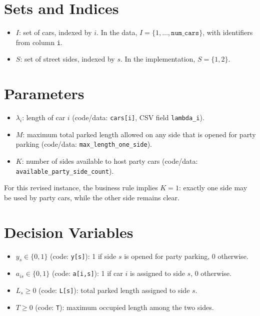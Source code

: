 \section*{Sets and Indices}

\begin{itemize}
    \item \(I\): set of cars, indexed by \(i\). In the data, \(I=\{1,\dots,\texttt{num\_cars}\}\), with identifiers from column \texttt{i}.
    \item \(S\): set of street sides, indexed by \(s\). In the implementation, \(S=\{1,2\}\).
\end{itemize}

\section*{Parameters}

\begin{itemize}
    \item \(\lambda_i\): length of car \(i\) (code/data: \texttt{cars[i]}, CSV field \texttt{lambda\_i}).
    \item \(M\): maximum total parked length allowed on any side that is opened for party parking (code/data: \texttt{max\_length\_one\_side}).
    \item \(K\): number of sides available to host party cars (code/data: \texttt{available\_party\_side\_count}).
\end{itemize}

For this revised instance, the business rule implies \(K=1\): exactly one side may be used by party cars, while the other side remains clear.

\section*{Decision Variables}

\begin{itemize}
    \item \(y_s \in \{0,1\}\) (code: \texttt{y[s]}): 1 if side \(s\) is opened for party parking, 0 otherwise.
    \item \(a_{is} \in \{0,1\}\) (code: \texttt{a[i,s]}): 1 if car \(i\) is assigned to side \(s\), 0 otherwise.
    \item \(L_s \ge 0\) (code: \texttt{L[s]}): total parked length assigned to side \(s\).
    \item \(T \ge 0\) (code: \texttt{T}): maximum occupied length among the two sides.
\end{itemize}

